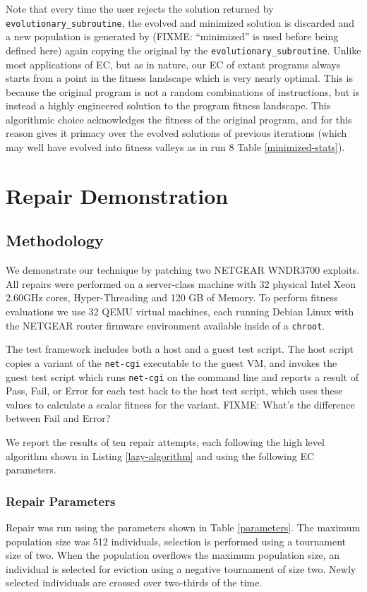 \documentclass{sigcomm-alternate}
\begin{document}
Note that every time the user rejects the
solution returned by \texttt{evolutionary\_subroutine}, the evolved and
minimized solution is discarded and a new population is generated by
(FIXME: ``minimized'' is used before being defined here)
again copying the original by the \texttt{evolutionary\_subroutine}.  Unlike
most applications of EC, but as in nature, our EC of extant programs
always starts from a point in the fitness landscape which is very
nearly optimal.  This is because the original program is not a random
combinations of instructions, but is instead 
a highly engineered solution to the program fitness
landscape.  This algorithmic choice acknowledges the fitness of the
original program, and for this reason gives it primacy over the
evolved solutions of previous iterations (which may well have evolved
into fitness valleys as in run 8 Table \ref{minimized-stats}).

\section{Repair Demonstration}
\label{sec-4}
\subsection{Methodology}
\label{sec-4-1}
We demonstrate our technique by patching two NETGEAR WNDR3700
exploits.  All repairs were performed on a server-class machine with
32 physical Intel Xeon 2.60GHz cores, Hyper-Threading and 120 GB of
Memory.  To perform fitness evaluations we use 32 QEMU virtual
machines, each running Debian Linux with the NETGEAR router firmware
environment available inside of a \texttt{chroot}.

The test framework includes both a host and a guest test script.  The
host script copies a variant of the \texttt{net-cgi} executable to the guest
VM, and invokes the guest test script which runs \texttt{net-cgi} on the
command line and reports a result of {\sc Pass}, {\sc Fail}, or 
{\sc Error} for each test back to the host test script, which uses these
values to calculate a scalar fitness for the variant. 
FIXME: What's the difference between Fail and Error? 

We report the results of ten repair attempts, each following the high
level algorithm shown in Listing \ref{lazy-algorithm} and using the
following EC parameters. 

\subsubsection{Repair Parameters}
\label{sec-4-1-1}
Repair was run using the parameters shown in Table \ref{parameters}.  The
maximum population size was 512 individuals, selection is performed
using a tournament size of two.  When the population overflows the
maximum population size, an individual is selected for eviction using
a negative tournament of size two.  Newly selected individuals are
crossed over two-thirds of the time.
\end{document}

